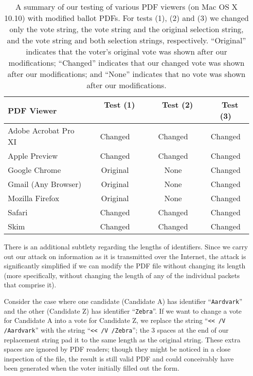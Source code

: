 \documentclass{article}
\begin{document}
\begin{table}[bt]
\begin{center}
\begin{tabular}{l|ccc}
\textbf{PDF Viewer} & \ \ \textbf{Test (1)} \ \ & \ \ \textbf{Test (2)} \ \ & \ \ \textbf{Test (3)} \\
\hline
Adobe Acrobat Pro XI & Changed & Changed & Changed \\
Apple Preview & Changed & Changed & Changed \\
Google Chrome & Original & None & Changed \\
Gmail (Any Browser) & Original & None & Changed \\
Mozilla Firefox & Original & None & Changed \\
Safari & Changed & Changed & Changed \\
Skim & Changed & Changed & Changed \\
\hline
\end{tabular}
\end{center}
\caption{A summary of our testing of various PDF viewers (on Mac OS X
  10.10) with modified ballot PDFs. For tests (1), (2) and (3)
  we changed only the vote string, the vote string and the original
  selection string, and the vote string and both selection strings,
  respectively. ``Original'' indicates that the voter's original vote
  was shown after our modifications; ``Changed'' indicates that our
  changed vote was shown after our modifications; and ``None''
  indicates that no vote was shown after our modifications.}
\label{table:pdfviewers}
\end{table}

There is an additional subtlety regarding the lengths of
identifiers. Since we carry out our attack on information as it is
transmitted over the Internet, the attack is significantly simplified
if we can modify the PDF file without changing its length (more
specifically, without changing the length of any of the individual
packets that comprise it).

Consider the case where one candidate (Candidate A) has identifier
``\texttt{Aardvark}'' and the other (Candidate Z) has identifier
``\texttt{Zebra}''. If we want to change a vote for Candidate A into a
vote for Candidate Z, we replace the string ``\texttt{<{}< /V
  /Aardvark}'' with the string ``\texttt{<{}< /V
  /Zebra\textvisiblespace\textvisiblespace\textvisiblespace}''; the 3
spaces at the end of our replacement string pad it to the same length
as the original string. These extra spaces are ignored by PDF readers;
though they might be noticed in a close inspection of the file, the
result is still valid PDF and could conceivably have been generated
when the voter initially filled out the form.
\end{document}
